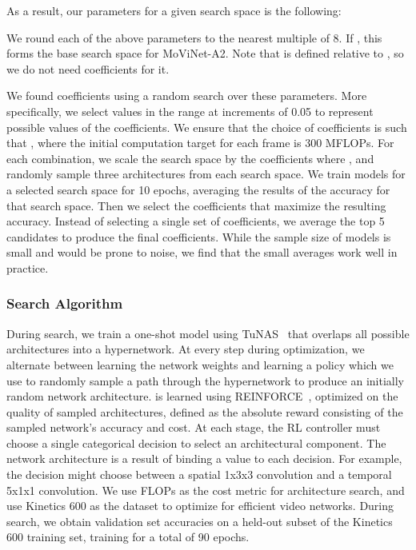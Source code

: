 \documentclass[final]{cvpr}
\newcommand{\ournet}{MoViNet\xspace} \newcommand{\ournets}{\ournet{}s\xspace}
\begin{document}
As a result, our parameters for a given search space is the following:

We round each of the above parameters to the nearest multiple of 8.
If , this forms the base search space for \ournet-A2.
Note that  is defined relative to , so we do not need coefficients for it.

We found coefficients  using a random search over these parameters.
More specifically, we select values in the range  at increments of 0.05 to represent possible values of the coefficients.
We ensure that the choice of coefficients is such that , where the initial computation target for each frame is 300 MFLOPs.
For each combination, we scale the search space by the coefficients where , and randomly sample three architectures from each search space.
We train models for a selected search space for 10 epochs, averaging the results of the accuracy for that search space.
Then we select the coefficients that maximize the resulting accuracy.
Instead of selecting a single set of coefficients, we average the top 5 candidates to produce the final coefficients.
While the sample size of models is small and would be prone to noise, we find that the small averages work well in practice.



\subsubsection{Search Algorithm}

During search, we train a one-shot model using TuNAS~\cite{bender2020can} that overlaps all possible architectures into a hypernetwork.
At every step during optimization, we alternate between learning the network weights and learning a policy  which we use to randomly sample a path through the hypernetwork to produce an initially random network architecture.
 is learned using REINFORCE~\cite{williams1992simple}, optimized on the quality of sampled architectures, defined as the absolute reward consisting of the sampled network's accuracy and cost.
At each stage, the RL controller must choose a single categorical decision to select an architectural component.
The network architecture is a result of binding a value to each decision.
For example, the decision might choose between a spatial 1x3x3 convolution and a temporal 5x1x1 convolution.
We use FLOPs as the cost metric for architecture search, and use Kinetics 600 as the dataset to optimize for efficient video networks. During search, we obtain validation set accuracies on a held-out subset of the Kinetics 600 training set, training for a total of 90 epochs.
\end{document}
